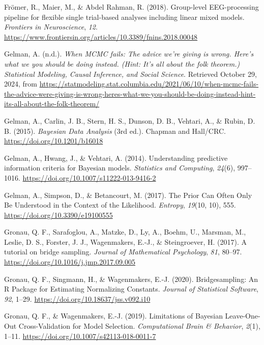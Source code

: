 \documentclass[
  doc,12pt,floatsintext]{apa7}
\newlength{\cslhangindent}
\newenvironment{CSLReferences}[2] %
 {\begin{list}{}{%
  \setlength{\itemindent}{0pt}
  \setlength{\leftmargin}{0pt}
  \setlength{\parsep}{0pt}
  \ifodd #1
   \setlength{\leftmargin}{\cslhangindent}
   \setlength{\itemindent}{-1\cslhangindent}
  \fi
  \setlength{\itemsep}{#2\baselineskip}}}
 {\end{list}}
\begin{document}
\begin{CSLReferences}{1}{0}
Frömer, R., Maier, M., \& Abdel Rahman, R. (2018). Group-level {EEG-processing} pipeline for flexible single trial-based analyses including linear mixed models. \emph{Frontiers in Neuroscience}, \emph{12}. \url{https://www.frontiersin.org/articles/10.3389/fnins.2018.00048}

Gelman, A. (n.d.). \emph{When {MCMC} fails: {The} advice we're giving is wrong. {Here}'s what we you should be doing instead. ({Hint}: It's all about the folk theorem.) \textbar{} {Statistical Modeling}, {Causal Inference}, and {Social Science}}. Retrieved October 29, 2024, from \url{https://statmodeling.stat.columbia.edu/2021/06/10/when-mcmc-fails-the-advice-were-giving-is-wrong-heres-what-we-you-should-be-doing-instead-hint-its-all-about-the-folk-theorem/}

Gelman, A., Carlin, J. B., Stern, H. S., Dunson, D. B., Vehtari, A., \& Rubin, D. B. (2015). \emph{Bayesian {Data Analysis}} (3rd ed.). {Chapman and Hall/CRC}. \url{https://doi.org/10.1201/b16018}

Gelman, A., Hwang, J., \& Vehtari, A. (2014). Understanding predictive information criteria for {Bayesian} models. \emph{Statistics and Computing}, \emph{24}(6), 997--1016. \url{https://doi.org/10.1007/s11222-013-9416-2}

Gelman, A., Simpson, D., \& Betancourt, M. (2017). The {Prior Can Often Only Be Understood} in the {Context} of the {Likelihood}. \emph{Entropy}, \emph{19}(10, 10), 555. \url{https://doi.org/10.3390/e19100555}

Gronau, Q. F., Sarafoglou, A., Matzke, D., Ly, A., Boehm, U., Marsman, M., Leslie, D. S., Forster, J. J., Wagenmakers, E.-J., \& Steingroever, H. (2017). A tutorial on bridge sampling. \emph{Journal of Mathematical Psychology}, \emph{81}, 80--97. \url{https://doi.org/10.1016/j.jmp.2017.09.005}

Gronau, Q. F., Singmann, H., \& Wagenmakers, E.-J. (2020). Bridgesampling: {An R Package} for {Estimating Normalizing Constants}. \emph{Journal of Statistical Software}, \emph{92}, 1--29. \url{https://doi.org/10.18637/jss.v092.i10}

Gronau, Q. F., \& Wagenmakers, E.-J. (2019). Limitations of {Bayesian Leave-One-Out Cross-Validation} for {Model Selection}. \emph{Computational Brain \& Behavior}, \emph{2}(1), 1--11. \url{https://doi.org/10.1007/s42113-018-0011-7}


\end{CSLReferences}
\end{document}
